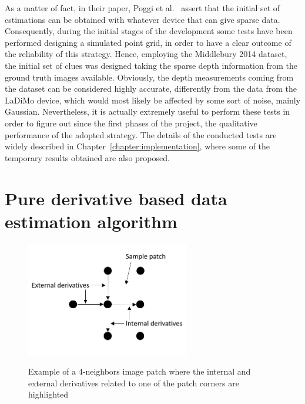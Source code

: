 As a matter of fact, in their paper, Poggi et al.~\cite{Poggi2019} assert that the initial set of estimations can be obtained with whatever device that can give sparse data.\\
Consequently, during the initial stages of the development some tests have been performed designing a simulated point grid, in order to have a clear outcome of the reliability of this strategy.
Hence, employing the Middlebury 2014 dataset, the initial set of clues was designed taking the sparse depth information from the ground truth images available. 
Obviously, the depth measurements coming from the dataset can be considered highly accurate, differently from the data from the LaDiMo device, which would most likely be affected by some sort of noise, mainly Gaussian. 
Nevertheless, it is actually extremely useful to perform these tests in order to figure out since the first phases of the project, the qualitative performance of the adopted strategy.
The details of the conducted tests are widely described in Chapter~\ref{chapter:implementation}, where some of the temporary results obtained are also proposed.

\section{Pure derivative based data estimation algorithm}
\label{section:deriv-based-algorithm}

\begin{figure}[t]
	\begin{center}
		{\includegraphics[width=.8\textwidth, height= 5cm, keepaspectratio]{images/sample-patch-derivative.png}}
\caption{Example of a 4-neighbors image patch where the internal and external derivatives related to one of the patch corners are highlighted}
\label{fig:example-patch-derivative}
	\end{center}
\end{figure}

